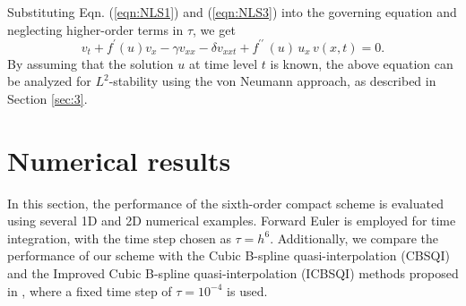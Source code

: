 \documentclass[11pt,a4paper]{amsart}
\theoremstyle{plain}
\theoremstyle{definition}
\theoremstyle{remark}
\numberwithin{equation}{section}
\begin{document}
Substituting Eqn. (\ref{eqn:NLS1}) and (\ref{eqn:NLS3}) into the governing equation  and neglecting higher-order terms in $\tau$, we get
\begin{equation}
v_t + f^{\prime}(u) v_x - \gamma v_{xx} - \delta v_{xxt} + f^{\prime \prime}\,(u)\,u_x\,v(x,t) = 0.
\end{equation}
By assuming that the solution $u$ at time level $t$ is known, the above equation can be analyzed for $L^2$-stability using the von Neumann approach, as described in Section \ref{sec:3}.

\section{Numerical results}\label{sec:4}
In this section, the performance of the sixth-order compact scheme is evaluated using several 1D and 2D numerical examples. Forward Euler is employed for time integration, with the time step chosen as $\tau = h^{6}$. Additionally, we compare the performance of our scheme with the Cubic B-spline quasi-interpolation (CBSQI) and the Improved Cubic B-spline quasi-interpolation (ICBSQI) methods proposed in \cite{kumar2016b}, where a fixed time step of $\tau = 10^{-4}$ is used.
\end{document}
